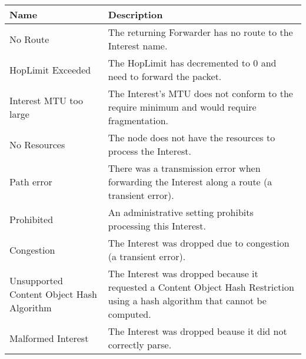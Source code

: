 \documentclass[12pt]{article}
\begin{document}
\begin{table}[t!]
\center
\begin{tabular}{|p{5cm}|p{9cm}|} \hline
{\bf Name} & {\bf Description} \\ \hline
No Route & The returning Forwarder has no route to the Interest name. \\
HopLimit Exceeded & The HopLimit has decremented to 0 and need to forward the packet. \\
Interest MTU too large & The Interest's MTU does not conform to the require minimum and would require fragmentation. \\
No Resources & The node does not have the resources to process the Interest. \\
Path error & There was a transmission error when forwarding the Interest along a route (a transient error). \\
Prohibited & An administrative setting prohibits processing this Interest. \\
Congestion & The Interest was dropped due to congestion (a transient error). \\
Unsupported Content Object Hash Algorithm & The Interest was dropped because it requested a Content Object Hash Restriction using a hash algorithm that cannot be computed. \\
Malformed Interest & The Interest was dropped beause it did not correctly parse. \\ \hline
\end{tabular}
\end{table}
\end{document}
